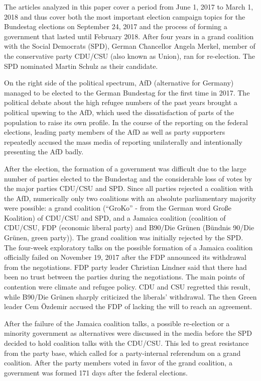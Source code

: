 \documentclass[
]{article}
\begin{document}
The articles analyzed in this paper cover a period from June 1, 2017 to
March 1, 2018 and thus cover both the most important election campaign
topics for the Bundestag elections on September 24, 2017 and the process
of forming a government that lasted until February 2018. After four
years in a grand coalition with the Social Democrats (SPD), German
Chancellor Angela Merkel, member of the conservative party CDU/CSU (also
known as Union), ran for re-election. The SPD nominated Martin Schulz as
their candidate.

On the right side of the political spectrum, AfD (alternative for
Germany) managed to be elected to the German Bundestag for the first
time in 2017. The political debate about the high refugee numbers of the
past years brought a political upswing to the AfD, which used the
dissatisfaction of parts of the population to raise its own profile. In
the course of the reporting on the federal elections, leading party
members of the AfD as well as party supporters repeatedly accused the
mass media of reporting unilaterally and intentionally presenting the
AfD badly.

After the election, the formation of a government was difficult due to
the large number of parties elected to the Bundestag and the
considerable loss of votes by the major parties CDU/CSU and SPD. Since
all parties rejected a coalition with the AfD, numerically only two
coalitions with an absolute parliamentary majority were possible: a
grand coalition (``GroKo'' - from the German word Große Koalition) of
CDU/CSU and SPD, and a Jamaica coalition (coalition of CDU/CSU, FDP
(economic liberal party) and B90/Die Grünen (Bündnis 90/Die Grünen,
green party)). The grand coalition was initially rejected by the SPD.
The four-week exploratory talks on the possible formation of a Jamaica
coalition officially failed on November 19, 2017 after the FDP announced
its withdrawal from the negotiations. FDP party leader Christian Lindner
said that there had been no trust between the parties during the
negotiations. The main points of contention were climate and refugee
policy. CDU and CSU regretted this result, while B90/Die Grünen sharply
criticized the liberals' withdrawal. The then Green leader Cem Özdemir
accused the FDP of lacking the will to reach an agreement.

After the failure of the Jamaica coalition talks, a possible re-election
or a minority government as alternatives were discussed in the media
before the SPD decided to hold coalition talks with the CDU/CSU. This
led to great resistance from the party base, which called for a
party-internal referendum on a grand coalition. After the party members
voted in favor of the grand coalition, a government was formed 171 days
after the federal elections.
\end{document}
